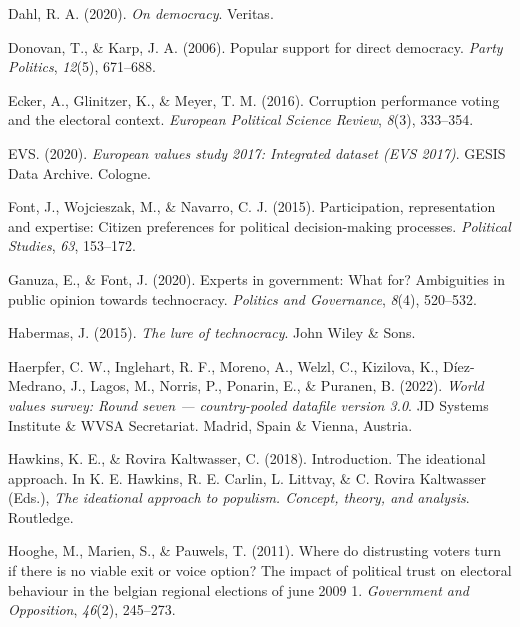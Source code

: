 \documentclass[
  12pt,
  english,
]{article}
\newlength{\cslhangindent}
\newlength{\cslentryspacingunit} %
\newenvironment{CSLReferences}[2] %
 {%
  \setlength{\parindent}{0pt}
  \ifodd #1
  \let\oldpar\par
  \def\par{\hangindent=\cslhangindent\oldpar}
  \fi
  \setlength{\parskip}{#2\cslentryspacingunit}
 }%
 {}
\begin{document}
\begin{CSLReferences}{1}{0}
\leavevmode{}%
Dahl, R. A. (2020). \emph{On democracy}. Veritas.

\leavevmode{}%
Donovan, T., \& Karp, J. A. (2006). Popular support for direct
democracy. \emph{Party Politics}, \emph{12}(5), 671--688.

\leavevmode{}%
Ecker, A., Glinitzer, K., \& Meyer, T. M. (2016). Corruption performance
voting and the electoral context. \emph{European Political Science
Review}, \emph{8}(3), 333--354.

\leavevmode{}%
EVS. (2020). \emph{European values study 2017: Integrated dataset (EVS
2017)}. GESIS Data Archive. Cologne.

\leavevmode{}%
Font, J., Wojcieszak, M., \& Navarro, C. J. (2015). Participation,
representation and expertise: Citizen preferences for political
decision-making processes. \emph{Political Studies}, \emph{63},
153--172.

\leavevmode{}%
Ganuza, E., \& Font, J. (2020). Experts in government: What for?
Ambiguities in public opinion towards technocracy. \emph{Politics and
Governance}, \emph{8}(4), 520--532.

\leavevmode{}%
Habermas, J. (2015). \emph{The lure of technocracy}. John Wiley \& Sons.

\leavevmode{}%
Haerpfer, C. W., Inglehart, R. F., Moreno, A., Welzl, C., Kizilova, K.,
Díez-Medrano, J., Lagos, M., Norris, P., Ponarin, E., \& Puranen, B.
(2022). \emph{World values survey: Round seven --- country-pooled
datafile version 3.0}. JD Systems Institute \& WVSA Secretariat. Madrid,
Spain \& Vienna, Austria.

\leavevmode{}%
Hawkins, K. E., \& Rovira Kaltwasser, C. (2018). Introduction. The
ideational approach. In K. E. Hawkins, R. E. Carlin, L. Littvay, \& C.
Rovira Kaltwasser (Eds.), \emph{The ideational approach to populism.
Concept, theory, and analysis}. Routledge.

\leavevmode{}%
Hooghe, M., Marien, S., \& Pauwels, T. (2011). Where do distrusting
voters turn if there is no viable exit or voice option? The impact of
political trust on electoral behaviour in the belgian regional elections
of june 2009 1. \emph{Government and Opposition}, \emph{46}(2),
245--273.


\end{CSLReferences}
\end{document}
